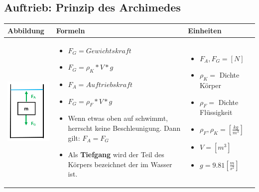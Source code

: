	\subsection{Auftrieb: Prinzip des Archimedes}				%
	\begin{table}[h!]
	\begin{tabular}{ | m{6cm} | m{7cm} | m{5cm} | }
	\hline
	Abbildung & Formeln & Einheiten \\ \hline
	\midrule
	\begin{minipage}{.3\textwidth}
	\includegraphics[width=3cm]{Figures/Auftrieb.png}
	\end{minipage}
	&
	\begin{itemize}
	\item $F_{G}=Gewichtskraft$
	\item $F_{G}=\rho_{K}*V*g$
	\item $F_{A}=Auftriebskraft$
	\item $F_{G}=\rho_{F}*V*g$
	\item {\color{red}Wenn etwas oben auf schwimmt, herrscht keine Beschleunigung. Dann gilt: $F_{A}=F_{G}$}
	\item {\color{red}Als \textbf{Tiefgang} wird der Teil des Körpers bezeichnet der im Wasser ist. } 
	\end{itemize}

	& 
	\begin{itemize}
	\item $F_{A},F_{G}=[N]$
	\item $\rho_{K}=$ Dichte Körper
	\item $\rho_{F}=$ Dichte Flüssigkeit
	\item $\rho_{F},\rho_{K}=[\frac{kg}{m^{3}}]$
	\item $V=[m^{3}]$
	\item $g=9.81[\frac{m}{s^{2}}]$
	\end{itemize}
	\\ \hline
	\end{tabular}
	\end{table}


